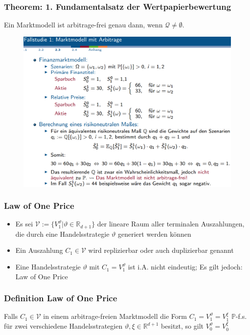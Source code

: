 \documentclass[12pt]{report}
\theoremstyle{dotless}
\theoremstyle{definition}
\begin{document}
\subsubsection{Theorem: 1. Fundamentalsatz der Wertpapierbewertung}
Ein Marktmodell ist arbitrage-frei genau dann, wenn $\mathcal{Q}\neq \emptyset$.

\begin{figure}[ht]
	\centering
	\includegraphics[width=\textwidth]{Bilder/Marktmodell.png}
\end{figure}



\subsubsection{Law of One Price}

\begin{itemize}
\item Es sei $\mathcal{V} := \{V_1^\vartheta | \vartheta \in \mathbb{R}_{d+1}\}$ der lineare Raum aller terminalen Auszahlungen, die durch eine Handelsstrategie 
$\vartheta$ generiert werden können
\item Ein Auszahlung $C_1 \in \mathcal{V}$ wird replizierbar oder auch duplizierbar genannt
\item Eine Handelsstrategie $\vartheta$ mit $C_1 = V_1^\vartheta$ ist i.A. nicht eindeutig; Es gilt jedoch: Law of One Price
\end{itemize}


\subsubsection{Definition Law of One Price}
Falls $C_1 \in \mathcal{V}$ in einem arbitrage-freien Marktmodell die Form $C_1=V_1^\vartheta = V_1^\xi$ $\mathbb{P}$-f.s. für zwei verschiedene Handelsstrategien $\vartheta, \xi \in \mathbb{R}^{d+1}$ besitzt, so gilt $V_0^\vartheta=V_0^\xi$
\end{document}
